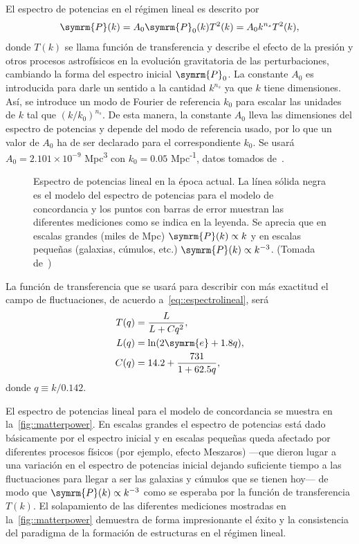 El espectro de potencias en el régimen lineal es descrito por
\begin{equation}
    \symrm{P}(k)=A_0\symrm{P}_0(k)T^2(k)=A_0k^{n_s}T^2(k),\label{eq::espectrolineal}
\end{equation}
donde \(T(k)\) se llama función de transferencia y describe el efecto de la presión y otros procesos astrofísicos en la evolución gravitatoria de las perturbaciones, cambiando la forma del espectro inicial \(\symrm{P}_0\). La constante \(A_0\) es introducida para darle un sentido a la cantidad \(k^{n_s}\) ya que \(k\) tiene dimensiones. Así, se introduce un modo de Fourier de referencia \(k_0\) para escalar las unidades de \(k\) tal que \(\left(k/k_0\right)^{n_s}\). De esta manera, la constante \(A_0\) lleva las dimensiones del espectro de potencias y depende del modo de referencia usado, por lo que un valor de \(A_0\) ha de ser declarado para el correspondiente \(k_0\). Se usará \(A_0=2.101\times 10^{-9}\) Mpc\textsuperscript{3} con \(k_0=0.05\) Mpc\textsuperscript{-1}, datos tomados de~\cite{collaboration2020planck}.
\begin{figure}[t]
    \centering
    \def\svgwidth{0.95\textwidth}
    
    \caption[Espectro de potencias lineal en la época actual]{Espectro de potencias lineal en la época actual. La línea sólida negra es el modelo del espectro de potencias para el modelo de concordancia y los puntos con barras de error muestran las diferentes mediciones como se indica en la leyenda. Se aprecia que en escalas grandes (miles de Mpc) \(\symrm{P}(k)\propto k\) y en escalas pequeñas (galaxias, cúmulos, etc.) \(\symrm{P}(k)\propto k^{-3}\). (Tomada de~\cite{collaboration2020planck1})}
    \label{fig::matterpower}
\end{figure}

La función de transferencia que se usará para describir con más     exactitud el campo de fluctuaciones, de acuerdo a~\ref{eq::espectrolineal}, será~\cite{eisenstein1998baryonic}
\begin{equation}
    \begin{aligned}
        T(q) & =\frac{L}{L+Cq^2},         \\
        L(q) & =\ln(2\symrm{e}+1.8q),     \\
        C(q) & =14.2+\frac{731}{1+62.5q},
    \end{aligned}\label{eq::transff}
\end{equation}
donde \(q\equiv k/0.142\).

El espectro de potencias lineal para el modelo de concordancia se muestra en la~\autoref{fig::matterpower}. En escalas grandes el espectro de potencias está dado básicamente por el espectro inicial y en escalas pequeñas queda afectado por diferentes procesos físicos (por ejemplo, efecto Meszaros) ---que dieron lugar a una variación en el espectro de potencias inicial dejando suficiente tiempo a las fluctuaciones para llegar a ser las galaxias y cúmulos que se tienen hoy--- de modo que \(\symrm{P}(k)\propto k^{-3}\) como se esperaba por la función de transferencia \(T(k)\). El solapamiento de las diferentes mediciones mostradas en la~\autoref{fig::matterpower} demuestra de forma impresionante el éxito y la consistencia del paradigma de la formación de estructuras en el régimen lineal.
